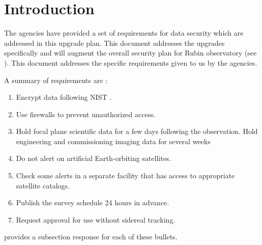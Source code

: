 \section{Introduction}

The agencies have provided a set of requirements for data security which are addressed in this upgrade plan.  This document addresses the upgrades specifically and will augment the overall security plan for Rubin observatory (see ).
This document addresses the specific requirements given to us by the agencies.

A summary of requirements are :
\begin{enumerate}

\item	Encrypt data following NIST .
\item	Use firewalls to prevent unauthorized  access.
\item	Hold focal plane scientific data for a few days following the observation. Hold engineering and commissioning imaging data for several weeks
\item	Do not alert on artificial Earth-orbiting satellites.
\item	Check some alerts in a separate facility that has access to appropriate satellite catalogs.
\item	Publish the survey schedule 24 hours in advance.
\item	Request approval for use  without sidereal tracking.

\end{enumerate}


 provides a subsection response for each of these bullets.
